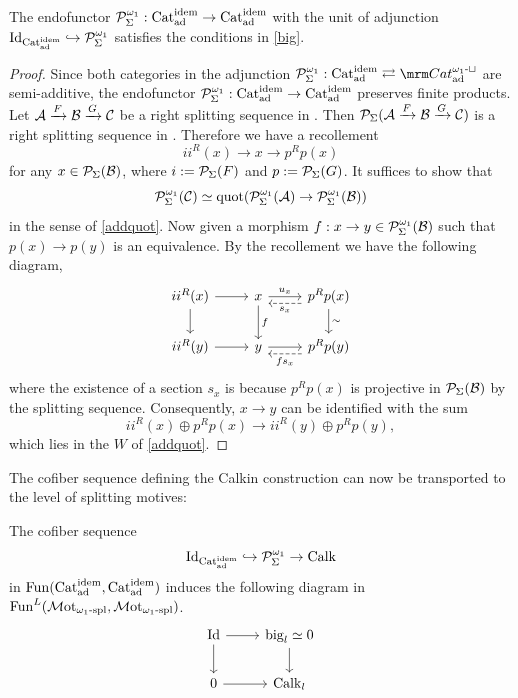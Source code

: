 \documentclass[a4paper,10pt, oneside]{amsart}
\begin{document}
\begin{prop}
	The endofunctor $\mathcal{P}_{\Sigma}^{\omega_1}:\mathrm{Cat}_{\mathrm{ad}}^{\mathrm{idem}}\to\mathrm{Cat}_{\mathrm{ad}}^{\mathrm{idem}}$ with the unit of adjunction $\mathrm{Id}_{\mathrm{Cat}_{\mathrm{ad}}^{\mathrm{idem}}}\hookrightarrow \mathcal{P}_{\Sigma}^{\omega_1}$ satisfies the conditions in \cref{big}. 
\end{prop}
\begin{proof}
	Since both categories in the adjunction $\mcp_{\Sigma}^{\omega_1}: \catadidem \rightleftarrows\Cat^{\omega_1\text{-}\sqcup}_{\op{ad}}$ are semi-additive, the endofunctor $\mathcal{P}_{\Sigma}^{\omega_1}:\mathrm{Cat}_{\mathrm{ad}}^{\mathrm{idem}}\to\mathrm{Cat}_{\mathrm{ad}}^{\mathrm{idem}}$ preserves finite products.
	Let $\mathcal{A}\xrightarrow{F}\mathcal{B}\xrightarrow{G}\mathcal{C}$ be a right splitting sequence in \catadidem. Then $\mathcal{P}_{\Sigma}(\mathcal{A}\xrightarrow{F}\mathcal{B}\xrightarrow{G}\mathcal{C})$ is a right splitting sequence in \praddbl. Therefore we have a recollement $$ii^R(x)\to x\to p^Rp(x)$$ for any $x\in\mathcal{P}_{\Sigma}(\mathcal{B})$, where $i:=\mathcal{P}_{\Sigma}(F)$ and $p:=\mathcal{P}_{\Sigma}(G)$. It suffices to show that $$\mathcal{P}_{\Sigma}^{\omega_1}(\mathcal{C})\simeq \mathrm{quot}(\mathcal{P}_{\Sigma}^{\omega_1}(\mathcal{A})\to\mathcal{P}_{\Sigma}^{\omega_1}(\mathcal{B}))$$ in the sense of \cref{addquot}. Now given a morphism $f:x\to y\in \mathcal{P}_{\Sigma}^{\omega_1}(\mathcal{B})$ such that $p(x)\to p(y)$ is an equivalence. By the recollement we have the following diagram,
	$$\begin{tikzcd}
		ii^R(x) \arrow[r] \arrow[d] & x \arrow[d, "f"] \arrow[r, "u_x"] & p^Rp(x) \arrow[d, "\sim"] \arrow[l, "s_x", dashed, shift left=2] \\
		ii^R(y) \arrow[r]           & y \arrow[r]                       & p^Rp(y) \arrow[l, "fs_x", dashed, shift left=2]                 
	\end{tikzcd}$$
	where the existence of a section $s_x$ is because $p^Rp(x)$ is projective in $\mathcal{P}_{\Sigma}(\mathcal{B})$ by the splitting sequence. Consequently,  $x\to y$ can be identified with the sum $$ii^R(x)\oplus p^Rp(x)\to ii^R(y)\oplus p^Rp(y),$$ which lies in  the $W$ of \cref{addquot}.
\end{proof}
The cofiber sequence defining the Calkin construction can now be transported
to the level of splitting motives:
\begin{cor}\label{diagram}
	The cofiber sequence $$\mathrm{Id}_{\mathrm{Cat}_{\mathrm{ad}}^{\mathrm{idem}}}\hookrightarrow \mathcal{P}_{\Sigma}^{\omega_1}\to \mathrm{Calk}$$ in $\operatorname{Fun}(\mathrm{Cat}_{\mathrm{ad}}^{\mathrm{idem}},\mathrm{Cat}_{\mathrm{ad}}^{\mathrm{idem}})$ induces the following diagram in $\operatorname{Fun}^L(\mathcal{M}\mathrm{ot}_{\omega_{1}\text{-}\mathrm{spl}},\mathcal{M}\mathrm{ot}_{\omega_{1}\text{-}\mathrm{spl}})$.
	$$\begin{tikzcd}
		\op{Id} \arrow[d] \arrow[r] & \op{big}_l\simeq0 \arrow[d] \\
		0 \arrow[r]                 & \calk_l                    
	\end{tikzcd}$$
\end{cor}
\end{document}
